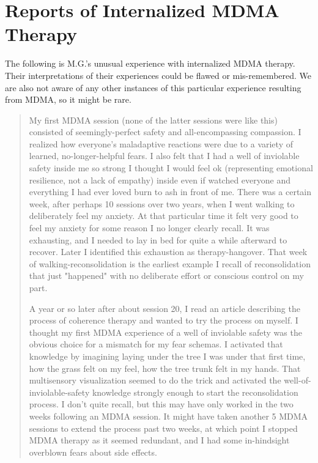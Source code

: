 \documentclass[12pt,letterpaper]{book}
\begin{document}
\chapter{Reports of Internalized MDMA Therapy}
\label{autobiography}
The following is M.G.'s unusual experience with internalized MDMA therapy. Their interpretations of their experiences could be flawed or mis-remembered. We are also not aware of any other instances of this particular experience resulting from MDMA, so it might be rare.
\begin{quotation}
    My first MDMA session (none of the latter sessions were like this) consisted of seemingly-perfect safety and all-encompassing compassion. I realized how everyone's maladaptive reactions were due to a variety of learned, no-longer-helpful fears. I also felt that I had a well of inviolable safety inside me so strong I thought I would feel ok (representing emotional resilience, not a lack of empathy) inside even if watched everyone and everything I had ever loved burn to ash in front of me. There was a certain week, after perhaps 10 sessions over two years, when I went walking to deliberately feel my anxiety. At that particular time it felt very good to feel my anxiety for some reason I no longer clearly recall. It was exhausting, and I needed to lay in bed for quite a while afterward to recover. Later I identified this exhaustion as therapy-hangover. That week of walking-reconsolidation is the earliest example I recall of reconsolidation that just "happened" with no deliberate effort or conscious control on my part.
    
    A year or so later after about session 20, I read an article describing the process of coherence therapy and wanted to try the process on myself. I thought my first MDMA experience of a well of inviolable safety was the obvious choice for a mismatch for my fear schemas. I activated that knowledge by imagining laying under the tree I was under that first time, how the grass felt on my feel, how the tree trunk felt in my hands. That multisensory visualization seemed to do the trick and activated the well-of-inviolable-safety knowledge strongly enough to start the reconsolidation process. I don't quite recall, but this may have only worked in the two weeks following an MDMA session. It might have taken another 5 MDMA sessions to extend the process past two weeks, at which point I stopped MDMA therapy as it seemed redundant, and I had some in-hindsight overblown fears about side effects.


\end{quotation}
\end{document}
